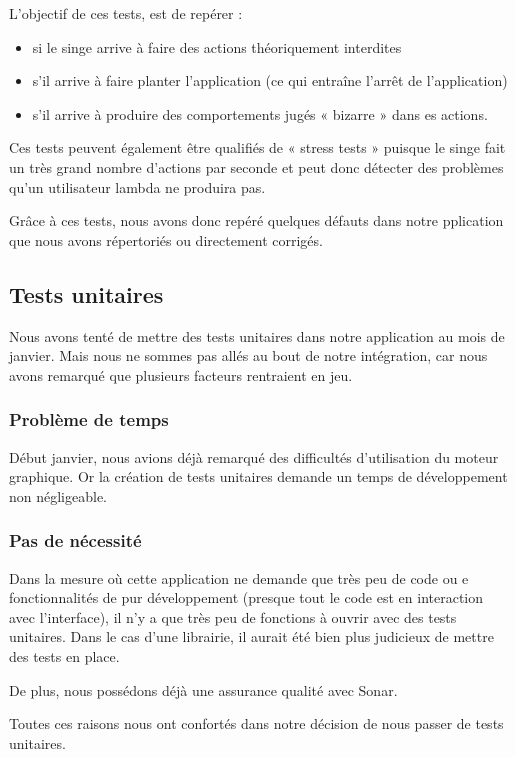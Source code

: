 \documentclass{report}
\begin{document}
L’objectif de ces tests, est de repérer :
\begin{itemize}
\item si le singe arrive à faire des actions théoriquement interdites
\item s’il arrive à faire planter l’application (ce qui entraîne l’arrêt
de l’application)
\item s’il arrive à produire des comportements jugés « bizarre » dans
es actions.
\end{itemize}
Ces tests peuvent également être qualifiés de « stress tests » puisque
le singe fait un très grand nombre d’actions par seconde et peut donc
détecter des problèmes qu’un utilisateur lambda ne produira pas.

Grâce à ces tests, nous avons donc repéré quelques défauts dans notre
pplication que nous avons répertoriés ou directement corrigés.

\subsection{Tests unitaires}

Nous avons tenté de mettre des tests unitaires dans notre application
au mois de janvier. Mais nous ne sommes pas allés au bout de notre
intégration, car nous avons remarqué que plusieurs facteurs rentraient
en jeu.

\subsubsection{Problème de temps}

Début janvier, nous avions déjà remarqué des difficultés d’utilisation
du moteur graphique. Or la création de tests unitaires demande un temps
de développement non négligeable.

\subsubsection{Pas de nécessité}

Dans la mesure où cette application ne demande que très peu de code ou
e fonctionnalités de pur développement (presque tout le code est en
interaction avec l’interface), il n’y a que très peu de fonctions à
ouvrir avec des tests unitaires. Dans le cas d’une librairie, il aurait
été bien plus judicieux de mettre des tests en place.

De plus, nous possédons déjà une assurance qualité avec Sonar.

Toutes ces raisons nous ont confortés dans notre décision de nous passer
de tests unitaires.
\end{document}
